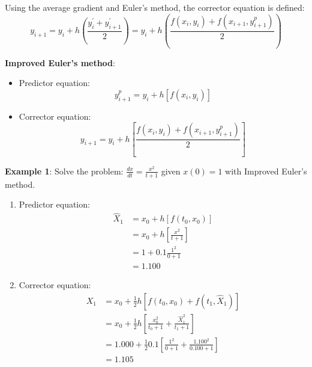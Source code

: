 \documentclass[10pt,a4paper]{article}
\begin{document}
Using the average gradient and Euler's method, the corrector equation is defined:
$$
y_{i+1}=y_i+h\left(\frac{y_i^\prime + y_{i+1}^\prime}{2}\right)=y_i + h\left(\frac{f(x_i,y_i)+f(x_{i+1},y_{i+1}^p)}{2}\right)
$$

\begin{tcolorbox}[breakable,colback=white,colframe=black,width=\dimexpr\textwidth+12mm\relax,enlarge left by=-6mm]
\textbf{Improved Euler's method}:
\begin{itemize}
    \item Predictor equation:
    $$
        y_{i+1}^p = y_i + h[f(x_i, y_i)]
    $$
    \item Corrector equation:
    $$
        y_{i+1}=y_i +h\left[\frac{f(x_i,y_i)+f(x_{i+1},y_{i+1}^p)}{2}\right]
    $$
\end{itemize}
\end{tcolorbox}

\textbf{Example 1}: Solve the problem: $\frac{dx}{dt}=\frac{x^2}{t+1}$ given $x(0)=1$ with Improved
Euler's method.

\begin{enumerate}
    \item Predictor equation: 
    \begin{equation*}
        \begin{aligned}
            \hat{X}_1 &= x_0+h[f(t_0,x_0)] \\
            &= x_0 + h\left[\frac{x^2}{t+1}\right] \\
            &= 1 + 0.1\frac{1^2}{0+1} \\
            &= 1.100
        \end{aligned}
    \end{equation*}
    \item Corrector equation:
    \begin{equation*}
        \begin{aligned}
            X_1 &= x_0+\frac{1}{2}h[f(t_0,x_0)+f(t_1,\hat{X}_1)] \\
            &= x_0+\frac{1}{2}h\left[\frac{x_0^2}{t_0+1}+\frac{\hat{X}_1^2}{t_1 + 1}\right] \\
            &= 1.000 + \frac{1}{2}0.1\left[\frac{1^2}{0+1}+\frac{1.100^2}{0.100+1}\right] \\
            &= 1.105
        \end{aligned}
    \end{equation*}
\end{enumerate}

\end{document}
